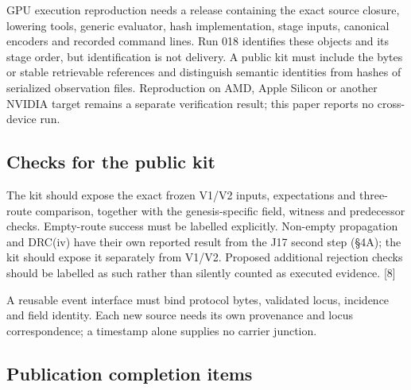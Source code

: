 \documentclass[
]{article}
\begin{document}
GPU execution reproduction needs a release containing the exact source
closure, lowering tools, generic evaluator, hash implementation, stage
inputs, canonical encoders and recorded command lines. Run 018
identifies these objects and its stage order, but identification is not
delivery. A public kit must include the bytes or stable retrievable
references and distinguish semantic identities from hashes of serialized
observation files. Reproduction on AMD, Apple Silicon or another NVIDIA
target remains a separate verification result; this paper reports no
cross-device run.

\subsection{Checks for the public kit}\label{checks-for-the-public-kit}

The kit should expose the exact frozen V1/V2 inputs, expectations and
three-route comparison, together with the genesis-specific field,
witness and predecessor checks. Empty-route success must be labelled
explicitly. Non-empty propagation and DRC(iv) have their own reported
result from the J17 second step (§4A); the kit should expose it
separately from V1/V2. Proposed additional rejection checks should be
labelled as such rather than silently counted as executed evidence.
{[}8{]}

A reusable event interface must bind protocol bytes, validated locus,
incidence and field identity. Each new source needs its own provenance
and locus correspondence; a timestamp alone supplies no carrier
junction.

\subsection{Publication completion
items}\label{publication-completion-items}
\end{document}
